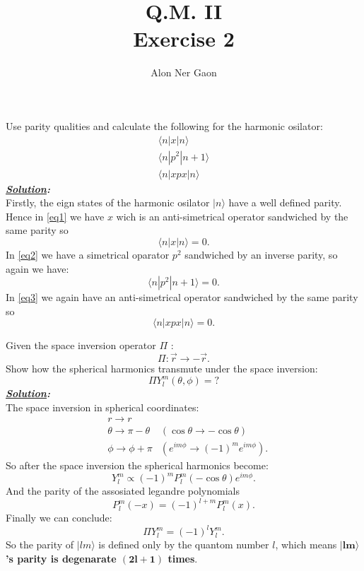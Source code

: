 \documentclass[notitlepage]{report}
\title{\Huge{Q.M. II}\\Exercise 2}
\author{Alon Ner Gaon}
\begin{document}
\maketitle

\begin{question}[title = Question 1]{}{}
Use parity qualities and calculate the following for the harmonic osilator:\\
\begin{gather}
	\langle n|x|n\rangle\label{eq1}\\
	\langle n|p^2|n+1\rangle\label{eq2} \\
	\langle n|xpx|n\rangle\label{eq3}
\end{gather}
\tcblower
\textbf{\emph{\underline{Solution}:}}\\
Firstly, the eign states of the harmonic osilator $|n\rangle$ have a well defined parity.\\
Hence in \eqref{eq1} we have $x$ wich is an anti-simetrical operator sandwiched by the same parity so\\
\[
	\langle n|x|n\rangle=0 
.\] 
In \eqref{eq2} we have a simetrical oparator $p^2$ sandwiched by an inverse parity, so again we have:\\
\[
	\langle n|p^2|n+1\rangle=0
.\]
In \eqref{eq3} we again have an anti-simetrical operator sandwiched by the same parity so\\
\[
	\langle n|xpx|n\rangle=0 
.\] 
\end{question}
\begin{question}[title = Question 2.1]{}{}
Given the space inversion operator $\Pi$ :\\
\[
	\Pi:\vec{r}\rightarrow - \vec{r}
.\] 
Show how the spherical harmonics transmute under the space inversion:\\
\[
	\Pi Y_l^m\left(\theta,\phi\right)=? 
\] 
\tcblower
\textbf{\emph{\underline{Solution}:}}\\
The space inversion in spherical coordinates:\\
\begin{align*}
	&r\rightarrow r    &\\
	&\theta \rightarrow \pi-\theta &\left(\cos\theta\rightarrow-\cos\theta\right)\\ 
	&\phi \rightarrow \phi+\pi &\left(e^{im\phi}\rightarrow\left(-1\right)^me^{im\phi}\right) 
.\end{align*}
\tcbbreak
So after the space inversion the spherical harmonics become:\\
\[
	Y^m_l\propto\left(-1\right)^mP^m_l\left(-\cos\theta\right)e^{im\phi}  
.\] 
And the parity of the assosiated legandre polynomials \\
\[
	P^m_l\left(-x\right) = \left(-1\right)^{l+m} P^m_l\left(x\right) 
.\] 
Finally we can conclude:\\
\[
	\Pi Y^m_l=\left(-1\right)^lY^m_l 
.\] 
So the parity of $|lm\rangle $ is defined only by the quantom number $l$, which means \textbf{$\boldsymbol{|lm\rangle}$'s parity is degenarate $\boldsymbol{\left(2l+1\right)}$ times}.
\end{question}
\end{document}
